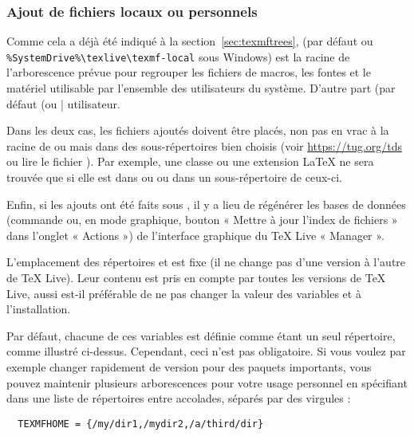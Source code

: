 \documentclass[german, english, french]{article}
\renewcommand{\TL}{\TeX{} Live\xspace}%
\begin{document}
\subsubsection{Ajout de fichiers locaux ou personnels}
\label{sec:local-personal-macros}

Comme cela a déjà été indiqué à la section~\ref{sec:texmftrees},
 (par défaut  ou
\verb|%SystemDrive%\texlive\texmf-local| sous Windows) est la racine de
l'arborescence prévue pour regrouper les fichiers de macros, les fontes et le
matériel utilisable par l'ensemble des utilisateurs du système.  D'autre part
 (par défaut  %
(ou |%
utilisateur.

Dans les deux cas, les fichiers ajoutés doivent être placés, non pas en vrac
à la racine de  ou  mais dans des
sous-répertoires bien choisis (voir \url{https://tug.org/tds} ou lire le fichier
). Par exemple, une classe ou une extension \LaTeX{} ne sera
trouvée que si elle est dans  ou
 ou dans un sous-répertoire de ceux-ci.

Enfin, si les ajouts ont été faits sous , il y a lieu de
régénérer les bases de données  (commande  ou,
en mode graphique, bouton « Mettre à jour l'index de fichiers » dans l'onglet
« Actions ») de l'interface graphique du \TL{} « Manager ».

L'emplacement des répertoires  et  est
fixe (il ne change pas d'une version à l'autre de \TL{}). Leur contenu est pris
en compte par toutes les versions de \TL{}, aussi est-il préférable de ne pas
changer la valeur des variables  et 
à l'installation.

Par défaut, chacune de ces variables est définie comme étant un seul répertoire,
comme illustré ci-dessus. Cependant, ceci n'est pas obligatoire.  Si vous voulez
par exemple changer rapidement de version pour des paquets importants, vous
pouvez maintenir plusieurs arborescences pour votre usage personnel en
spécifiant dans  une liste de répertoires entre accolades,
séparés par des virgules :

\begin{verbatim}
  TEXMFHOME = {/my/dir1,/mydir2,/a/third/dir}
\end{verbatim}
\end{document}

